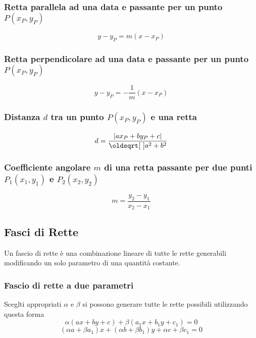 \subsubsection{Retta parallela ad una data e passante per un punto $P(x_P,y_P)$}
\begin{equation*}
y-y_P = m(x-x_P)
\end{equation*}

\subsubsection{Retta perpendicolare ad una data e passante per un punto $P(x_P,y_P)$}
\begin{equation*}
y - y_P = -\frac{1}{m} (x - x_P)
\end{equation*}

\subsubsection{Distanza $d$ tra un punto $P(x_P,y_P)$ e una retta}
\begin{equation*}
d = \frac{\abs{ax_P + by_P +c}}{\sqrt{a^2+b^2}}
\end{equation*}

\subsubsection{Coefficiente angolare $m$ di una retta passante per due punti $P_1(x_1,y_1)$ e 
$P_2(x_2,y_2)$}
\begin{equation*}
m=\frac{y_2-y_1}{x_2-x_1}
\end{equation*}

\subsection{Fasci di Rette}\label{subsec:geomanal:fasciorette}
Un fascio di rette è una combinazione lineare di tutte le rette generabili modificando un solo 
parametro di una quantità costante.

\subsubsection{Fascio di rette a due parametri}
Sceglti appropriati $\alpha$ e $\beta$ si possono generare tutte le rette possibili utilizzando questa
forma
\begin{equation*}
\alpha(ax + by + c) + \beta(a_1x + b_1y + c_1) = 0
\end{equation*}
\begin{equation*}
(\alpha a + \beta a_1)x + (\alpha b + \beta b_1)y + \alpha c + \beta c_1 = 0
\end{equation*}

